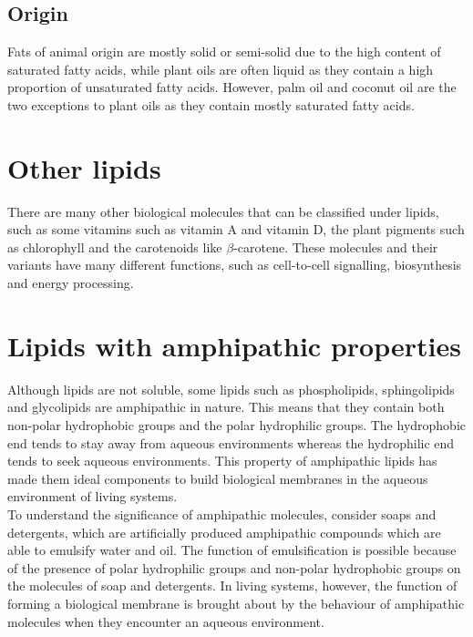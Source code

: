 \documentclass[11pt]{article}
\begin{document}
\subsection{Origin}
\label{sec:orga42eedc}
Fats of animal origin are mostly solid or semi-solid due to the high content of saturated fatty acids, while plant oils are often liquid as they contain a high proportion of unsaturated fatty acids. However, palm oil and coconut oil are the two exceptions to plant oils as they contain mostly saturated fatty acids.

\section{Other lipids}
\label{sec:orge5d3196}
There are many other biological molecules that can be classified under lipids, such as some vitamins such as vitamin A and vitamin D, the plant pigments such as chlorophyll and the carotenoids like \(\beta\)-carotene. These molecules and their variants have many different functions, such as cell-to-cell signalling, biosynthesis and energy processing.

\newpage

\section{Lipids with amphipathic properties}
\label{sec:org8e3b90d}
Although lipids are not soluble, some lipids such as phospholipids, sphingolipids and glycolipids are amphipathic in nature. This means that they contain both non-polar hydrophobic groups and the polar hydrophilic groups. The hydrophobic end tends to stay away from aqueous environments whereas the hydrophilic end tends to seek aqueous environments. This property of amphipathic lipids has made them ideal components to build biological membranes in the aqueous environment of living systems.
\\[0pt]

To understand the significance of amphipathic molecules, consider soaps and detergents, which are artificially produced amphipathic compounds which are able to emulsify water and oil. The function of emulsification is possible because of the presence of polar hydrophilic groups and non-polar hydrophobic groups on the molecules of soap and detergents. In living systems, however, the function of forming a biological membrane is brought about by the behaviour of amphipathic molecules when they encounter an aqueous environment.
\\[0pt]
\end{document}
